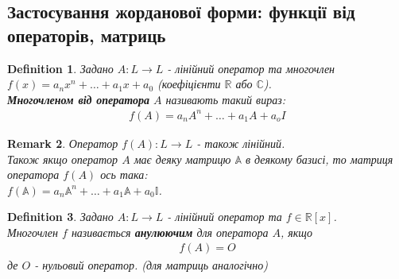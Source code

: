 \documentclass[a4paper, 10pt]{article}
\makeatletter
\theoremstyle{theoremdd}
\newtheorem{theorem}{Theorem}[subsection]
\newtheorem{definition}[theorem]{Definition}
\newtheorem{remark}[theorem]{Remark}
\renewenvironment{proof}[1][Proof.\\]{\par
\pushQED{\hfill \qed}%
\normalfont \topsep6\p@\@plus6\p@\relax
\trivlist
\item\relax
{\bfseries
#1\@addpunct{.}}\hspace\labelsep\ignorespaces
}{%
\popQED\endtrivlist\@endpefalse
}
\makeatother
\begin{document}
\iffalse
\begin{theorem}[Єдиність форми Жордана]
Жорданова форма оператора $A: L \to L$ визначена єдиним чином із точністю до перестановок клітин Жордана.\\
Тобто форма Жордана не залежить від обраного базису власних та приєднаних векторів.
\end{theorem}

\begin{proof}
Кількість клітин для кожного власного числа та заданою розмірністю $k \times k$ визначається числом $R_k$. Отже, для $A$ це визначається однозначно.\\
Наостанок: переставленню клітин у Жорданової формі відповідає переставлення ланцюжків з власного та башти приєднаних до нього векторів.
\end{proof}
\fi

\subsection{Застосування жорданової форми: функції від операторів, матриць}
\begin{definition}
Задано $A \colon L \to L$ - лінійний оператор та многочлен $f(x) = a_n x^n + \dots + a_1 x + a_0$ (коефіцієнти $\mathbb{R}$ або $\mathbb{C}$).\\
\textbf{Многочленом від оператора} $A$ називають такий вираз:
\begin{align*}
f(A) = a_n A^n + \dots + a_1 A + a_o I
\end{align*}
\end{definition}

\begin{remark}
Оператор $f(A) \colon L \to L$ - також лінійний.\\
Також якщо оператор $A$ має деяку матрицю $\mathbb{A}$ в деякому базисі, то матриця оператора $f(A)$ ось така:\\
$f(\mathbb{A}) = a_n \mathbb{A}^n + \dots + a_1 \mathbb{A} + a_0 \mathbb{I}$.
\end{remark}

\begin{definition}
Задано $A \colon L \to L$ - лінійний оператор та $f \in \mathbb{R}[x]$.\\
Многочлен $f$ називається \textbf{анулюючим} для оператора $A$, якщо
\begin{align*}
f(A) = O
\end{align*}
де $O$ - нульовий оператор. (для матриць аналогічно)
\end{definition}
\end{document}
